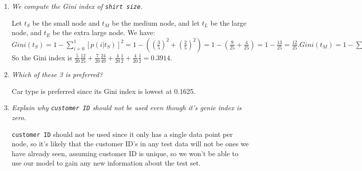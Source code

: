 \documentclass{amsbook}
\theoremstyle{plain}
\numberwithin{section}{chapter}
\numberwithin{equation}{chapter}
\theoremstyle{definition}
\theoremstyle{remark}
\newcommand{\fracc}{\frac}
\newcommand{\lpar}{\left(}
\newcommand{\rpar}{\right)}
\newcommand{\inlinecode}{\texttt}
\begin{document}
\begin{enumerate}
Let $t_F$ be the family node and $t_S$ be the sports node, and let $t_L$ be the luxury node. We have:
$
Gini(t_S) = 1 - \sum_{i = 0}^1[p(i|t_S)]^2
= 1 - \lpar \lpar \fracc{10}{10} \rpar ^2 + \lpar \fracc{0}{10} \rpar^2 \rpar
= 1 - 1 
= 0. 
Gini(t_F) = 1 - \sum_{i = 0}^1[p(i|t_F)]^2
= 1 - \lpar \lpar \fracc{1}{4} \rpar ^2 + \lpar \fracc{3}{4} \rpar^2 \rpar
= 1 - \lpar \fracc{1}{16} + \fracc{9}{16} \rpar 
= 1 - \fracc{5}{8}
= \fracc{3}{8}. 
Gini(t_L) = 1 - \sum_{i = 0}^1[p(i|t_L)]^2
= 1 - \lpar \lpar \fracc{1}{8} \rpar ^2 + \lpar \fracc{7}{8} \rpar^2 \rpar
= 1 - \lpar \fracc{1}{64} + \fracc{49}{64} \rpar 
= 1 - \fracc{25}{32}
= \fracc{7}{32}. 
$
So the Gini index is $\fracc{8}{20}0+ \fracc{4}{20}\fracc{3}{8} + \fracc{8}{20}\fracc{7}{32} = 0.1625$. 









\item \textit{We compute the Gini index of \inlinecode{shirt size}. }

Let $t_S$ be the small node and $t_M$ be the medium node, and let $t_L$ be the large node, and $t_E$ be the extra large node. We have:
$
Gini(t_S) = 1 - \sum_{i = 0}^1[p(i|t_S)]^2
= 1 - \lpar \lpar \fracc{3}{5} \rpar ^2 + \lpar \fracc{2}{5} \rpar^2 \rpar
= 1 - \lpar \fracc{9}{25} + \fracc{4}{25} \rpar
= 1 - \fracc{13}{25} 
= \fracc{12}{25}.
Gini(t_M) = 1 - \sum_{i = 0}^1[p(i|t_M)]^2
= 1 - \lpar \lpar \fracc{3}{7} \rpar ^2 + \lpar \fracc{4}{7} \rpar^2 \rpar
= 1 - \lpar \fracc{9}{49} + \fracc{16}{49} \rpar 
= 1 - \fracc{25}{49}
= \fracc{24}{49}. 
Gini(t_L) = 1 - \sum_{i = 0}^1[p(i|t_L)]^2
= 1 - \lpar \lpar \fracc{2}{4} \rpar ^2 + \lpar \fracc{2}{4} \rpar^2 \rpar
= 1 - \lpar \fracc{1}{4} + \fracc{1}{4} \rpar 
= 1 - \fracc{1}{2}
= \fracc{1}{2}. 
Gini(t_E) = 1 - \sum_{i = 0}^1[p(i|t_E)]^2
= 1 - \lpar \lpar \fracc{2}{4} \rpar ^2 + \lpar \fracc{2}{4} \rpar^2 \rpar
= 1 - \lpar \fracc{1}{4} + \fracc{1}{4} \rpar 
= 1 - \fracc{1}{2}
= \fracc{1}{2}. 
$
So the Gini index is $\fracc{5}{20}\fracc{12}{25}+ \fracc{7}{20}\fracc{24}{49} + \fracc{4}{20}\fracc{1}{2} + \fracc{4}{20}\fracc{1}{2}= 0.3914$. 

\item \textit{Which of these 3 is preferred?}

Car type is preferred since its Gini index is lowest at 0.1625.

\item \textit{Explain why \inlinecode{customer ID} should not be used even though it's genie index is zero. }

\inlinecode{customer ID} should not be used since it only has a single data point per node, so it's likely that the customer ID's in any test data will not be ones we have already seen, assuming customer ID is unique, so we won't be able to use our model to gain any new information about the test set. 


\end{enumerate}
\end{document}
